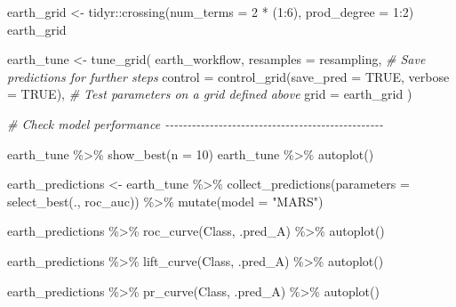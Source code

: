 \documentclass[
]{book}
\newenvironment{Shaded}{\begin{snugshade}}{\end{snugshade}}
\newcommand{\AttributeTok}[1]{\textcolor[rgb]{0.77,0.63,0.00}{#1}}
\newcommand{\CommentTok}[1]{\textcolor[rgb]{0.56,0.35,0.01}{\textit{#1}}}
\newcommand{\ConstantTok}[1]{\textcolor[rgb]{0.00,0.00,0.00}{#1}}
\newcommand{\DecValTok}[1]{\textcolor[rgb]{0.00,0.00,0.81}{#1}}
\newcommand{\FunctionTok}[1]{\textcolor[rgb]{0.00,0.00,0.00}{#1}}
\newcommand{\NormalTok}[1]{#1}
\newcommand{\OtherTok}[1]{\textcolor[rgb]{0.56,0.35,0.01}{#1}}
\newcommand{\SpecialCharTok}[1]{\textcolor[rgb]{0.00,0.00,0.00}{#1}}
\newcommand{\StringTok}[1]{\textcolor[rgb]{0.31,0.60,0.02}{#1}}
\begin{document}
\begin{Shaded}
\begin{Highlighting}[]
\NormalTok{earth\_grid }\OtherTok{\textless{}{-}}\NormalTok{ tidyr}\SpecialCharTok{::}\FunctionTok{crossing}\NormalTok{(}\AttributeTok{num\_terms =} \DecValTok{2} \SpecialCharTok{*}\NormalTok{ (}\DecValTok{1}\SpecialCharTok{:}\DecValTok{6}\NormalTok{), }\AttributeTok{prod\_degree =} \DecValTok{1}\SpecialCharTok{:}\DecValTok{2}\NormalTok{) }
\NormalTok{earth\_grid}

\NormalTok{earth\_tune }\OtherTok{\textless{}{-}} 
  \FunctionTok{tune\_grid}\NormalTok{(}
\NormalTok{    earth\_workflow, }
    \AttributeTok{resamples =}\NormalTok{ resampling, }
    \CommentTok{\# Save predictions for further steps}
    \AttributeTok{control =} \FunctionTok{control\_grid}\NormalTok{(}\AttributeTok{save\_pred =} \ConstantTok{TRUE}\NormalTok{, }\AttributeTok{verbose =} \ConstantTok{TRUE}\NormalTok{),}
    \CommentTok{\# Test parameters on a grid defined above}
    \AttributeTok{grid =}\NormalTok{ earth\_grid}
\NormalTok{  ) }


\CommentTok{\# Check model performance {-}{-}{-}{-}{-}{-}{-}{-}{-}{-}{-}{-}{-}{-}{-}{-}{-}{-}{-}{-}{-}{-}{-}{-}{-}{-}{-}{-}{-}{-}{-}{-}{-}{-}{-}{-}{-}{-}{-}{-}{-}{-}{-}{-}{-}{-}{-}{-}{-}}

\NormalTok{earth\_tune }\SpecialCharTok{\%\textgreater{}\%} \FunctionTok{show\_best}\NormalTok{(}\AttributeTok{n =} \DecValTok{10}\NormalTok{)}
\NormalTok{earth\_tune }\SpecialCharTok{\%\textgreater{}\%} \FunctionTok{autoplot}\NormalTok{()}

\NormalTok{earth\_predictions }\OtherTok{\textless{}{-}}\NormalTok{ earth\_tune }\SpecialCharTok{\%\textgreater{}\%}
  \FunctionTok{collect\_predictions}\NormalTok{(}\AttributeTok{parameters =} \FunctionTok{select\_best}\NormalTok{(., }\StringTok{\textquotesingle{}roc\_auc\textquotesingle{}}\NormalTok{)) }\SpecialCharTok{\%\textgreater{}\%}
  \FunctionTok{mutate}\NormalTok{(}\AttributeTok{model =} \StringTok{"MARS"}\NormalTok{)}

\NormalTok{earth\_predictions }\SpecialCharTok{\%\textgreater{}\%}
  \FunctionTok{roc\_curve}\NormalTok{(Class, .pred\_A) }\SpecialCharTok{\%\textgreater{}\%}
  \FunctionTok{autoplot}\NormalTok{()}

\NormalTok{earth\_predictions }\SpecialCharTok{\%\textgreater{}\%}
  \FunctionTok{lift\_curve}\NormalTok{(Class, .pred\_A) }\SpecialCharTok{\%\textgreater{}\%}
  \FunctionTok{autoplot}\NormalTok{()}

\NormalTok{earth\_predictions }\SpecialCharTok{\%\textgreater{}\%}
  \FunctionTok{pr\_curve}\NormalTok{(Class, .pred\_A) }\SpecialCharTok{\%\textgreater{}\%}
  \FunctionTok{autoplot}\NormalTok{()}


\end{Highlighting}
\end{Shaded}
\end{document}
